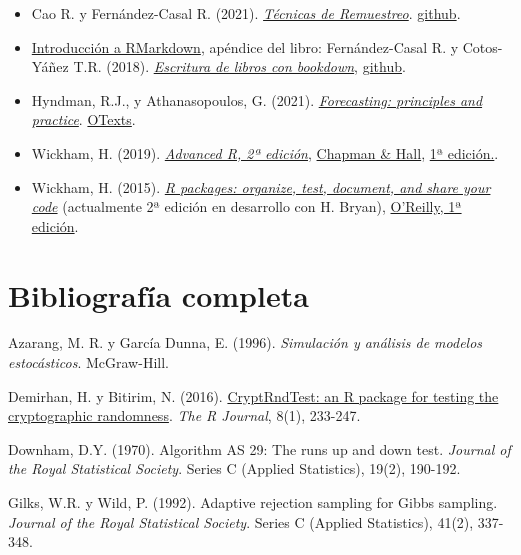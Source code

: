 \documentclass[
]{book}
\theoremstyle{break}
\theoremstyle{nonumberplain}
\begin{document}
\begin{itemize}
\item
  Cao R. y Fernández-Casal R. (2021). \emph{\href{https://rubenfcasal.github.io/book_remuestreo}{Técnicas de Remuestreo}}. \href{https://github.com/rubenfcasal/book_remuestreo}{github}.
\item
  \href{https://rubenfcasal.github.io/bookdown_intro/rmarkdown.html}{Introducción a RMarkdown}, apéndice del libro: Fernández-Casal R. y Cotos-Yáñez T.R. (2018). \emph{\href{https://rubenfcasal.github.io/bookdown_intro}{Escritura de libros con bookdown}}, \href{https://github.com/rubenfcasal/bookdown_intro}{github}.
\item
  Hyndman, R.J., y Athanasopoulos, G. (2021). \emph{\href{https://otexts.com/fpp3}{Forecasting: principles and practice}}. \href{https://www.amazon.es/dp/0987507133}{OTexts}.
\item
  Wickham, H. (2019). \emph{\href{https://adv-r.hadley.nz/}{Advanced R, 2ª edición}}, \href{https://www.amazon.com/dp/0815384572}{Chapman \& Hall}, \href{http://adv-r.had.co.nz/}{1ª edición.}.
\item
  Wickham, H. (2015). \emph{\href{http://r-pkgs.had.co.nz/}{R packages: organize, test, document, and share your code}} (actualmente 2ª edición en desarrollo con H. Bryan), \href{http://shop.oreilly.com/product/0636920034421.do}{O'Reilly, 1ª edición}.
\end{itemize}

\hypertarget{bibliografuxeda-completa}{%
\section*{Bibliografía completa}\label{bibliografuxeda-completa}}

Azarang, M. R. y García Dunna, E. (1996). \emph{Simulación y análisis de modelos estocásticos}. McGraw-Hill.

Demirhan, H. y Bitirim, N. (2016). \href{https://journal.r-project.org/archive/2016/RJ-2016-016/index.html}{CryptRndTest: an R package for testing the cryptographic randomness}. \emph{The R Journal}, 8(1), 233-247.

Downham, D.Y. (1970). Algorithm AS 29: The runs up and down test. \emph{Journal of the Royal Statistical Society}. Series C (Applied Statistics), 19(2), 190-192.

Gilks, W.R. y Wild, P. (1992). Adaptive rejection sampling for Gibbs sampling. \emph{Journal of the Royal Statistical Society}. Series C (Applied Statistics), 41(2), 337-348.
\end{document}
